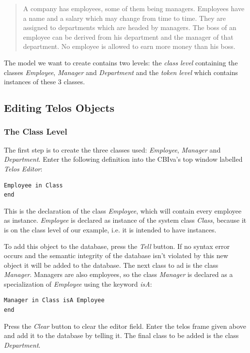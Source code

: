 \documentclass[10pt,a4paper]{article}
\begin{document}
{\it
\begin{quote}
A company has employees, some of them being managers. Employees
have a name and a salary which may change from time to time. They
are assigned to departments which are headed by managers. The boss
of an employee can be derived from his department and the manager of
that department. No employee is allowed to earn more money than his
boss.
\end{quote}
}

The model we want to create contains two levels: the {\em class level}
containing the classes {\em Employee}, {\em Manager} and {\em Department} and
the {\em token level} which contains instances of these 3 classes.


\subsection{Editing Telos Objects}

\subsubsection{The Class Level}


The first step is to create the three classes used:
{\em Employee}, {\em Manager} and {\em Department}. Enter the following definition
into the CBIva's top window labelled {\em Telos Editor}:

\begin{verbatim}
Employee in Class
end
\end{verbatim}

This is the declaration of the class {\em Employee}, which will contain
every employee as instance. {\em Employee} is declared as instance of the
system class {\em Class}, because it is on the class level of our example,
i.e. it is intended to have instances.


To add this object to the database, press the {\em Tell} button.
If no syntax error occurs and the semantic integrity of the database
isn't violated by this new object it will be added to the database.
The next class to ad is the class {\em Manager}. Managers are also employees,
so the class {\em Manager} is declared as a specialization of {\em Employee}
using the keyword {\em isA}:

\begin{verbatim}
Manager in Class isA Employee
end
\end{verbatim}

Press the {\em Clear} button to clear the editor field.
Enter the telos frame given above and add it to the database by telling it.
The final class to be added is the class {\em Department}. \\
\end{document}
